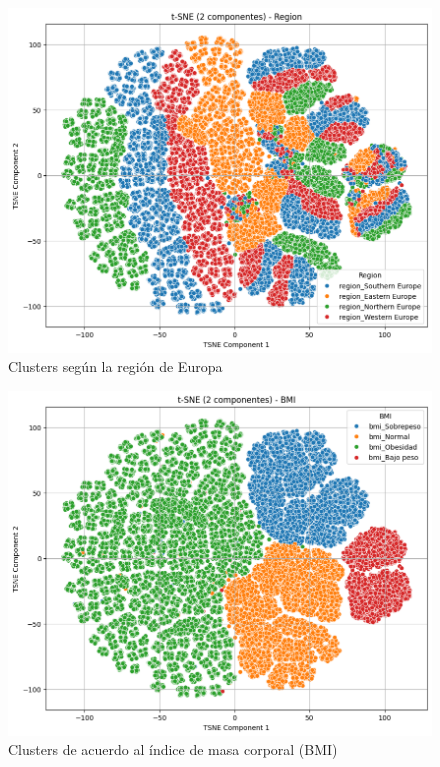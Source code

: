 \documentclass[10pt,journal,compsoc]{IEEEtran}
\begin{document}
\begin{figure}[htb]
    \centering
    \includegraphics[width=\linewidth]{imagenes/region.png}
    \caption{Clusters según la región de Europa}
    \label{fig:tsne_region}
\end{figure}

\begin{figure}[htb]
    \centering
    \includegraphics[width=\linewidth]{imagenes/bmi.png}
    \caption{Clusters de acuerdo al índice de masa corporal (BMI)}
    \label{fig:tsne_bmi}
\end{figure}
\end{document}
